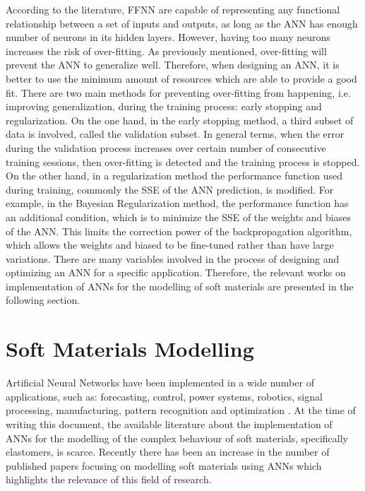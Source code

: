 According to the literature, FFNN are capable of representing any functional relationship between a set of inputs and outputs, as long as the ANN has enough number of neurons in its hidden layers. However, having too many neurons increases the risk of over-fitting. As previously mentioned, over-fitting will prevent the ANN to generalize well. Therefore, when designing an ANN, it is better to use the minimum amount of resources which are able to provide a good fit. There are two main methods for preventing over-fitting from happening, i.e. improving generalization, during the training process: early stopping and regularization. On the one hand, in the early stopping method, a third subset of data is involved, called the validation subset. In general terms, when the error during the validation process increases over certain number of consecutive training sessions, then over-fitting is detected and the training process is stopped. On the other hand, in a regularization method the performance function used during training, commonly the SSE of the ANN prediction, is modified. For example, in the Bayesian Regularization method, the performance function has an additional condition, which is to minimize the SSE of the weights and biases of the ANN. This limits the correction power of the backpropagation algorithm, which allows the weights and biased to be fine-tuned rather than have large variations. There are many variables involved in the process of designing and optimizing an ANN for a specific application. Therefore, the relevant works on implementation of ANNs for the modelling of soft materials are presented in the following section.

\section{Soft Materials Modelling }

Artificial Neural Networks have been implemented in a wide number of applications, such as: forecasting, control, power systems, robotics, signal processing, manufacturing, pattern recognition and optimization \cite{khan2019fabrication}. At the time of writing this document, the available literature about the implementation of ANNs for the modelling of the complex behaviour of soft materials, specifically elastomers, is scarce. Recently there has been an increase in the number of published papers focusing on modelling soft materials using ANNs which highlights the relevance of this field of research.

